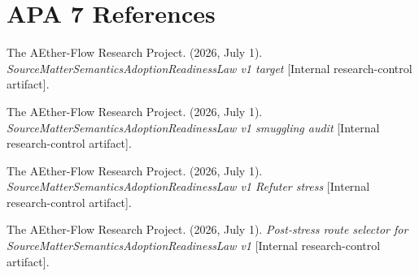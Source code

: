 \documentclass[11pt]{article}
\begin{document}
\section{APA 7 References}

The AEther-Flow Research Project. (2026, July 1).
\emph{SourceMatterSemanticsAdoptionReadinessLaw v1 target}
[Internal research-control artifact].

The AEther-Flow Research Project. (2026, July 1).
\emph{SourceMatterSemanticsAdoptionReadinessLaw v1 smuggling audit}
[Internal research-control artifact].

The AEther-Flow Research Project. (2026, July 1).
\emph{SourceMatterSemanticsAdoptionReadinessLaw v1 Refuter stress}
[Internal research-control artifact].

The AEther-Flow Research Project. (2026, July 1).
\emph{Post-stress route selector for SourceMatterSemanticsAdoptionReadinessLaw v1}
[Internal research-control artifact].
\end{document}
